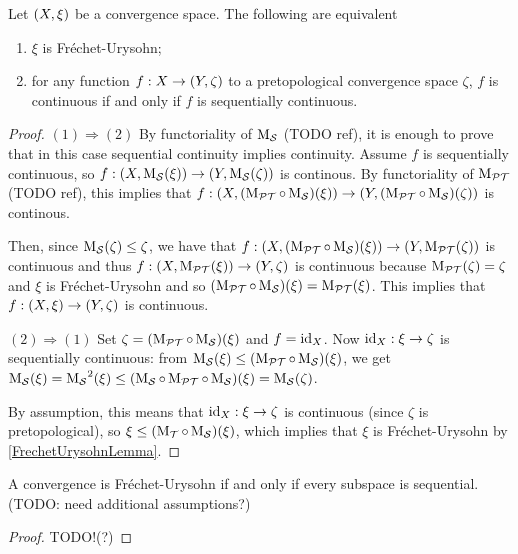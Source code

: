 \begin{proposition} \label{FrechetUrysohnSequentialContinuity}
Let $\sSet{X,\xi}$ be a convergence space. The following are equivalent
\begin{enumerate}
\item $\xi$ is Fréchet-Urysohn;
\item for any function $f: X\to \sSet{Y,\zeta}$ to a pretopological convergence space $\zeta$, $f$ is continuous \textup{if and only if} $f$ is sequentially continuous.
\end{enumerate}
\end{proposition}
\begin{proof}
$(1) \Rightarrow (2)$ By functoriality of $\operatorname{M_\mathcal{S}}$ (TODO ref), it is enough to prove that in this case sequential continuity implies continuity. Assume $f$ is sequentially continuous, so $f: \sSet{X, \seqMod(\xi)} \to \sSet{Y, \seqMod(\zeta)}$ is continous. By functoriality of $\operatorname{M_\mathcal{PT}}$ (TODO ref), this implies that $f: \sSet{X, (\pretopMod\circ \seqMod)(\xi)} \to \sSet{Y, (\pretopMod\circ\seqMod)(\zeta)}$ is continous.

Then, since $\operatorname{M_\mathcal{S}}(\zeta) \leq \zeta$, we have that $f: \sSet{X, (\pretopMod\circ \seqMod)(\xi)} \to \sSet{Y, \pretopMod(\zeta)}$ is continuous and thus $f: \sSet{X, \pretopMod(\xi)} \to \sSet{Y, \zeta}$ is continuous because $\operatorname{M_\mathcal{PT}}(\zeta) = \zeta$ and $\xi$ is Fréchet-Urysohn and so $(\operatorname{M_\mathcal{PT}}\circ \operatorname{M_\mathcal{S}})(\xi) = \operatorname{M_\mathcal{PT}}(\xi)$. This implies that $f: \sSet{X, \xi} \to \sSet{Y, \zeta}$ is continuous.

$(2) \Rightarrow (1)$ Set $\zeta = (\operatorname{M_\mathcal{PT}}\circ \operatorname{M_\mathcal{S}})(\xi)$ and $f = \operatorname{id}_X$. Now $\operatorname{id}_X: \xi \to \zeta$ is sequentially continuous: from $\operatorname{M_\mathcal{S}}(\xi) \leq (\operatorname{M_\mathcal{PT}}\circ \operatorname{M_\mathcal{S}})(\xi)$, we get $\operatorname{M_\mathcal{S}}(\xi) = \operatorname{M_\mathcal{S}}^2(\xi) \leq (\operatorname{M_\mathcal{S}}\circ \operatorname{M_\mathcal{PT}}\circ \operatorname{M_\mathcal{S}})(\xi) = \operatorname{M_\mathcal{S}}(\zeta)$.

By assumption, this means that $\operatorname{id}_X: \xi \to \zeta$ is continuous (since $\zeta$ is pretopological), so $\xi \leq (\operatorname{M_\mathcal{T}}\circ \operatorname{M_\mathcal{S}})(\xi)$, which implies that $\xi$ is Fréchet-Urysohn by \ref{FrechetUrysohnLemma}.
\end{proof}


\begin{proposition}
A convergence is Fréchet-Urysohn \textup{if and only if} every subspace is sequential. (TODO: need additional assumptions?)
\end{proposition}
\begin{proof}
TODO!(?)
\end{proof}

